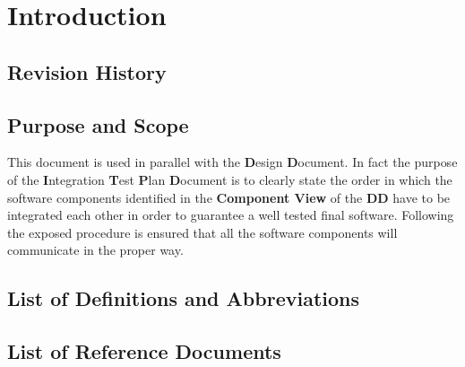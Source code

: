 \section{Introduction}

\subsection{Revision History}


\subsection{Purpose and Scope}
This document is used in parallel with the  \textbf{D}esign \textbf{D}ocument. In fact the purpose of the \textbf{I}ntegration \textbf{T}est \textbf{P}lan \textbf{D}ocument is to clearly state the order in which the software components identified in the \textbf{Component View} of the \textbf{DD} have to be integrated each other in order to guarantee a well tested final software. Following the exposed procedure is ensured that all the software components will communicate in the proper way.

\subsection{List of Definitions and Abbreviations}

\subsection{List of Reference Documents}
